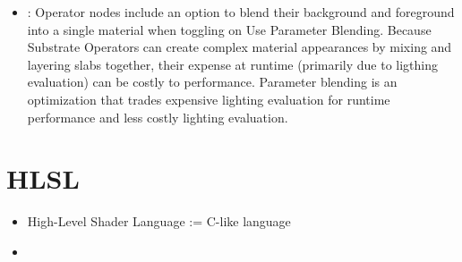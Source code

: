                 \begin{itemize}
                    \item {}:    Operator nodes include an option to blend their background and foreground into
                                                            a single material when toggling on Use Parameter Blending. Because Substrate Operators
                                                            can create complex material appearances by mixing and layering slabs together, their expense
                                                            at runtime (primarily due to ligthing evaluation) can be costly to performance.
                                                            Parameter blending is an optimization that trades expensive lighting evaluation
                                                            for runtime performance and less costly lighting evaluation.
                \end{itemize}
                
                
            
    \section{HLSL}

        \begin{itemize}
            \item High-Level Shader Language := C-like language
            \item 
        \end{itemize}